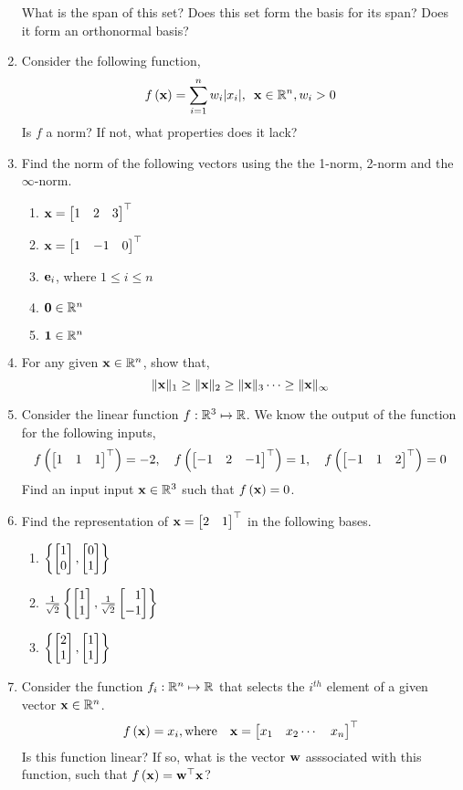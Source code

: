 \documentclass[
10pt, %
a4paper, %
oneside, %
headinclude,footinclude, %
BCOR5mm, %
]{scrartcl}
\def\mf{\ensuremath\mathbf}
\def\mb{\ensuremath\mathbb}
\def\lc{\ensuremath\left\{}
\def\rc{\ensuremath\right\}}
\def\bmx{\ensuremath\begin{bmatrix*}[r]}
\def\emx{\ensuremath\end{bmatrix*}}
\begin{document}
\begin{enumerate}
What is the span of this set? Does this set form the basis for its span? Does it form an orthonormal basis?

\item Consider the following function,
\[ f\pp{\mf{x}} = \sum_{i=1}^n w_i \vert x_i \vert, \,\,\, \mf{x} \in \mb{R}^n, w_i > 0 \]
Is $f$ a norm? If not, what properties does it lack?

\item Find the norm of the following vectors using the the 1-norm, 2-norm and the $\infty$-norm.
\begin{enumerate}
	\item $\mf{x} = \bmx 1 & 2 & 3 \emx^\top$
	\item $\mf{x} = \bmx 1 & -1 & 0 \emx^\top$
	\item $\mf{e}_i$, where $1 \leq i \leq n$
	\item $\mf{0} \in \mb{R}^n$
	\item $\mf{1} \in \mb{R}^n$
\end{enumerate}

\item For any given $\mf{x} \in \mb{R}^n$, show that,
$$ \Vert \mf{x} \Vert_1 \geq \Vert \mf{x} \Vert_2 \geq \Vert \mf{x} \Vert_3 \cdots \geq \Vert \mf{x} \Vert_\infty $$

\item Consider the linear function $f : \mb{R}^3 \mapsto \mb{R}$. We know the output of the function for the following inputs,
\[ f\pp{\bmx 1 & 1  & 1\emx^\top} = -2, \quad f\pp{\bmx -1 & 2  & -1\emx^\top} = 1, \quad f\pp{\bmx -1 & 1  & 2\emx^\top} = 0 \]
Find an input input $\mf{x} \in \mb{R}^3$ such that $f\pp{\mf{x}} = 0$.

\item Find the representation of $\mf{x} = \bmx 2 & 1\emx^\top$ in the following bases.
\begin{enumerate}
	\item $\lc \bmx 1 \\ 0\emx, \bmx 0 \\ 1 \emx \rc$
	\item $\frac{1}{\sqrt{2}}\lc \bmx 1 \\ 1\emx, \frac{1}{\sqrt{2}}\bmx 1 \\ -1 \emx \rc$
	\item $\lc \bmx 2 \\ 1\emx, \bmx 1 \\ 1 \emx \rc$
\end{enumerate}

\item Consider the function $f_i : \mb{R}^n \mapsto \mb{R}$ that selects the $i^{th}$ element of a given vector $\mf{x} \in \mb{R}^n$.
\[ f\pp{\mf{x}} = x_i, \text{where} \quad \mf{x} = \bmx x_1 & x_2 \cdots & x_n \emx^\top \]
Is this function linear? If so, what is the vector $\mf{w}$ asssociated with this function, such that $f\pp{\mf{x}} = \mf{w}^\top\mf{x}$?


\end{enumerate}
\end{document}
